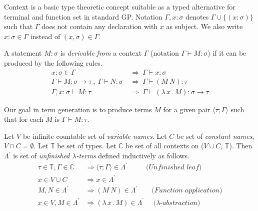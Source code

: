 \documentclass{llncs}
\newcommand{\lterms}{$\lambda$-terms\xspace}
\newcommand{\tur}[3]{#1\vdash{}#2 \colon #3}
\newcommand{\then}{\Rightarrow\xspace}
\newcommand{\lamb}[2]{( \lambda \, #1 \, . \, #2 )}
\newcommand{\ar}{\rightarrow\xspace}
\newcommand{\T}{\mathbb{T}\xspace}
\newcommand{\C}{\mathbb{C}\xspace}
\newenvironment{todo}
{~\\ {\color{red}\textbf{TODO}}
  \begin{easylist}[itemize]}
{ \end{easylist}}
\newcommand{\Lpr}{\Lambda^\prime}
\newcommand{\ul}[2]{\langle #1 ; #2 \rangle}
\begin{document}
Context is a basic type theoretic concept suitable as a typed alternative
for terminal and function set in standard GP. 
Notation $\Gamma,x:\sigma $ denotes $ \Gamma\cup\{(x:\sigma)\}$ 
such that $\Gamma$ does not contain any declaration with $x$ as subject.
We also write $x:\sigma \in \Gamma$ instead of $(x,\sigma) \in \Gamma$.



\begin{definition}
A statement $M\colon\sigma$ is \textit{derivable from}
a context $\Gamma$ (notation 
\mbox{$\Gamma\vdash{}M\colon\sigma$}) 
if it can be produced by the following rules.
\begin{align*}
x : \sigma \in \Gamma &~\then~ \tur{\Gamma}{x}{\sigma}\\
\tur{\Gamma}{M}{\sigma \ar \tau}~,~\tur{\Gamma}{N}{\sigma} 
&~\then~ \tur{\Gamma}{(M~N)}{\tau}\\  
\tur{\Gamma,x:\sigma}{M}{\tau}
&~\then~ \tur{\Gamma}{\lamb{x}{M}}{\sigma \ar \tau} 
\end{align*}
\end{definition}

Our goal in term generation is to produce terms $M$
for a given pair $\ul{\tau}{\Gamma}$
such that for each $M$ is $\tur{\Gamma}{M}{\tau}$.




%


\begin{definition}
Let $V$ be infinite countable set of {\it 
variable names}. Let $C$ be set of {\it constant names}, 
$V \cap C = \emptyset$.	
Let $\T$ be set of types.
Let $\C$ be set of all contexts on ($V \cup C$, $\T$).
Then $\Lpr$ is set of 
\textit{unfinished  \lterms} defined inductively as follows.	
\begin{align*}
\tau \in \T , \Gamma \in \C &\then \ul{\tau}{\Gamma} \in \Lpr
\textit{~~~~~~~~(Unfinished leaf)}\\
x   \in V \cup C  &\then x     \in \Lpr \\
M,N \in \Lpr   &\then (M~N) \in \Lpr 
\textit{~~~~~~(Function application)} \\
x   \in V , M \in \Lpr &\then \lamb{x}{M} \in \Lpr
\textit{~~~~($\lambda$-abstraction)} 
\end{align*}
\end{definition}
\end{document}

